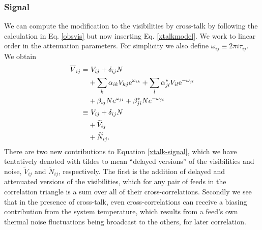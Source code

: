 \subsubsection{Signal}
We can compute the modification to the visibilities by cross-talk by following the calculation in Eq. \ref{obsvis} but now inserting Eq. \ref{xtalkmodel}. We work to linear order in the attenuation parameters. For simplicity we also define $\omega_{ij} \equiv 2\pi i \tau_{ij}$. We obtain
\begin{align}
\overline{V}_{ij} = &~ V_{ij} + \delta_{ij} N
\nonumber \\
&+ \sum_k \alpha_{ik} V_{kj} {\rm e}^{\omega_{ik}} + \sum_l \alpha^*_{jl} V_{il} {\rm e}^{-\omega_{jl}}
\nonumber \\
&+ \beta_{ij} N e^{\omega_{ji}} + \beta_{ji}^*N e^{- \omega_{ji}}
\label{xtalk-signal} \\ \nonumber
\equiv &~ V_{ij} + \delta_{ij} N
\\ \nonumber &+ \widetilde{V}_{ij}
\\ &+ \widetilde{N}_{ij}. \label{tilde-def}
\end{align}
There are two new contributions to Equation \ref{xtalk-signal}, which we have tentatively denoted with tildes to mean ``delayed versions'' of the visibilities and noise, $\widetilde{V}_{ij}$ and $\widetilde{N}_{ij}$, respectively. The first is the addition of delayed and attenuated versions of the visibilities, which for any pair of feeds in the correlation triangle is a sum over all of their cross-correlations. Secondly we see that in the presence of cross-talk, even cross-correlations can receive a biasing contribution from the system temperature, which results from a feed's own thermal noise fluctuations being broadcast to the others, for later correlation.

